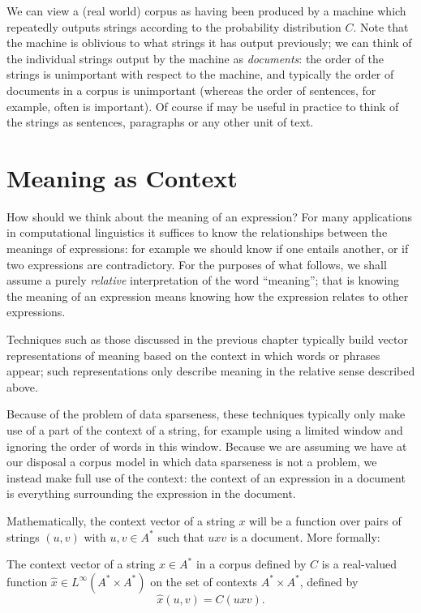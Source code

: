 \documentclass[11pt]{report}
\begin{document}

We can view a (real world) corpus as having been produced by a machine which repeatedly outputs strings according to the probability distribution $C$. Note that the machine is oblivious to what strings it has output previously; we can think of the individual strings output by the machine as \emph{documents}: the order of the strings is unimportant with respect to the machine, and typically the order of documents in a corpus is unimportant (whereas the order of sentences, for example, often is important). Of course if may be useful in practice to think of the strings as sentences, paragraphs or any other unit of text.

\section{Meaning as Context}

 How should we think about the meaning of an expression? For many applications in computational linguistics it suffices to know the relationships between the meanings of expressions: for example we should know if one entails another, or if two expressions are contradictory. For the purposes of what follows, we shall assume a purely \emph{relative} interpretation of the word ``meaning''; that is knowing the meaning of an expression means knowing how the expression relates to other expressions.

Techniques such as those discussed in the previous chapter typically build vector representations of meaning based on the context in which words or phrases appear; such representations only describe meaning in the relative sense described above.

Because of the problem of data sparseness, these techniques typically only make use of a part of the context of a string, for example using a limited window and ignoring the order of words in this window. Because we are assuming we have at our disposal a corpus model in which data sparseness is not a problem, we instead make full use of the context: the context of an expression in a document is  everything surrounding the expression in the document.


Mathematically, the context vector of a string $x$ will be a function over pairs of strings $(u,v)$ with $u,v \in A^*$ such that $uxv$ is a document. More formally:
\begin{defn}
The context vector of a string $x \in A^*$ in a corpus defined by $C$ is a real-valued function $\hat{x}\in L^\infty(A^*\times A^*)$  on the set of contexts $A^* \times A^*$, defined by
$$\hat{x}(u,v) = C(uxv).$$
\end{defn}
\end{document}
